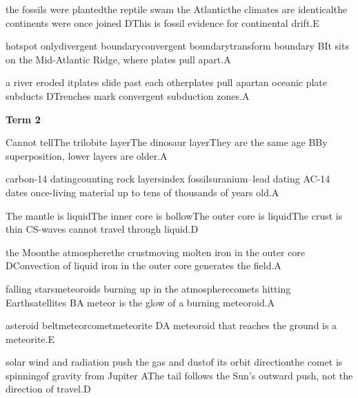 \begin{gradebody}
{the fossils were planted}{the reptile swam the Atlantic}{the climates are identical}{the continents were once joined}
{D}{This is fossil evidence for continental drift.}{E}

{hotspot only}{divergent boundary}{convergent boundary}{transform boundary}
{B}{It sits on the Mid-Atlantic Ridge, where plates pull apart.}{A}

{a river eroded it}{plates slide past each other}{plates pull apart}{an oceanic plate subducts}
{D}{Trenches mark convergent subduction zones.}{A}

\textbf{Term 2}

{Cannot tell}{The trilobite layer}{The dinosaur layer}{They are the same age}
{B}{By superposition, lower layers are older.}{A}

{carbon-14 dating}{counting rock layers}{index fossils}{uranium--lead dating}
{A}{C-14 dates once-living material up to tens of thousands of years old.}{A}

{The mantle is liquid}{The inner core is hollow}{The outer core is liquid}{The crust is thin}
{C}{S-waves cannot travel through liquid.}{D}

{the Moon}{the atmosphere}{the crust}{moving molten iron in the outer core}
{D}{Convection of liquid iron in the outer core generates the field.}{A}

{falling stars}{meteoroids burning up in the atmosphere}{comets hitting Earth}{satellites}
{B}{A meteor is the glow of a burning meteoroid.}{A}

{asteroid belt}{meteor}{comet}{meteorite}
{D}{A meteoroid that reaches the ground is a meteorite.}{E}

{solar wind and radiation push the gas and dust}{of its orbit direction}{the comet is spinning}{of gravity from Jupiter}
{A}{The tail follows the Sun's outward push, not the direction of travel.}{D}


\end{gradebody}
